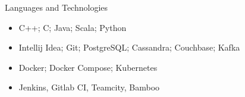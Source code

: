 \documentclass[]{cv}
\begin{document}
	\begin{cvsection}{Languages and Technologies}
		\begin{cvsubsection}{}{}{}
			\begin{itemize}
				\item C++; C; Java; Scala; Python
				\item Intellij Idea; Git; PostgreSQL; Cassandra; Couchbase; Kafka
				\item Docker; Docker Compose; Kubernetes
				\item Jenkins, Gitlab CI, Teamcity, Bamboo
			\end{itemize}
		\end{cvsubsection}
	\end{cvsection}
\end{document}
